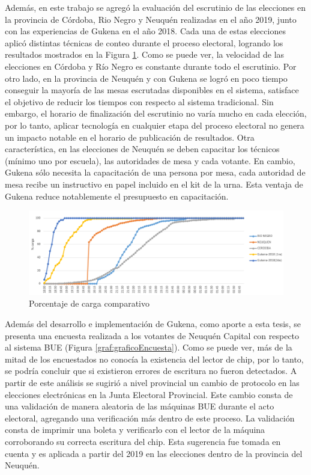 Además, en este trabajo se agregó la evaluación del escrutinio de las elecciones en la provincia de Córdoba, Rio Negro y Neuquén realizadas en el año 2019, junto con las experiencias de Gukena en el año 2018. Cada una de estas elecciones aplicó distintas técnicas de conteo durante el proceso electoral, logrando los resultados mostrados en la Figura \ref{graf:provincialConGukenaComparativo}. Como se puede ver, la velocidad de las elecciones en Córdoba y Río Negro es constante durante todo el escrutinio. Por otro lado, en la provincia de Neuquén y con Gukena se logró en poco tiempo conseguir la mayoría de las mesas escrutadas disponibles en el sistema, satisface el objetivo de reducir los tiempos con respecto al sistema tradicional. Sin embargo, el horario de finalización del escrutinio no varía mucho en cada elección, por lo tanto, aplicar tecnología en cualquier etapa del proceso electoral no genera un impacto notable en el horario de publicación de resultados.\newline
Otra característica, en las elecciones de Neuquén se deben capacitar los técnicos (mínimo uno por escuela), las autoridades de mesa y cada votante. En cambio, Gukena sólo necesita la capacitación de una persona por mesa, cada autoridad de mesa recibe un instructivo en papel incluido en el kit de la urna. Esta ventaja de Gukena reduce notablemente el presupuesto en capacitación.

\begin{figure}[h!]
    \begin{center}
        \includegraphics[width=\textwidth]{img/provincialGukena.png}
    \end{center}
  \caption{Porcentaje de carga comparativo}
  \label{graf:provincialConGukenaComparativo}
\end{figure}

Además del desarrollo e implementación de Gukena, como aporte a esta tesis, se presenta una encuesta realizada a los votantes de Neuquén Capital con respecto al sistema BUE (Figura \ref{graf:graficoEncuesta}). Como se puede ver, más de la mitad de los encuestados no conocía la existencia del lector de chip, por lo tanto, se podría concluir que si existieron errores de escritura no fueron detectados. A partir de este análisis se sugirió a nivel provincial un cambio de protocolo en las elecciones electrónicas en la Junta Electoral Provincial. Este cambio consta de una validación de manera aleatoria de las máquinas BUE durante el acto electoral, agregando una verificación más dentro de este proceso. La validación consta de imprimir una boleta y verificarlo con el lector de la máquina corroborando su correcta escritura del chip. Esta sugerencia fue tomada en cuenta y es aplicada a partir del 2019 en las elecciones dentro de la provincia del Neuquén.


